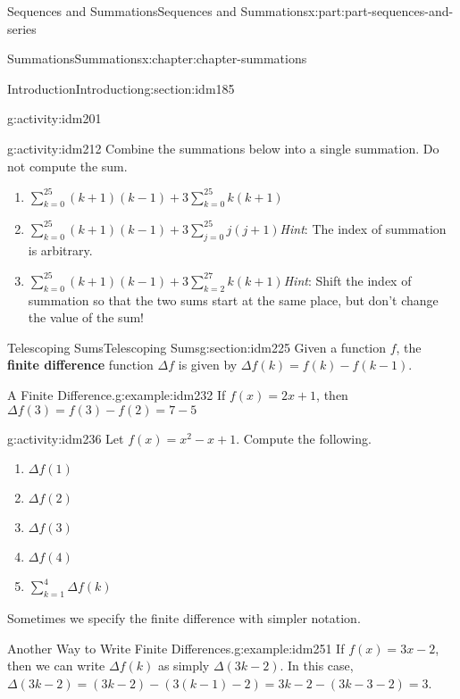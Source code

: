 \documentclass[oneside,10pt,]{book}
\newcommand{\terminology}[1]{\textbf{#1}}
\begin{document}
\begin{partptx}{Sequences and Summations}{}{Sequences and Summations}{}{}{x:part:part-sequences-and-series}
\begin{chapterptx}{Summations}{}{Summations}{}{}{x:chapter:chapter-summations}
\begin{sectionptx}{Introduction}{}{Introduction}{}{}{g:section:idm185}
\begin{activity}{}{g:activity:idm201}
\end{activity}
\begin{activity}{}{g:activity:idm212}%
Combine the summations below into a single summation. Do not compute the sum.%
\begin{enumerate}[font=\bfseries,label=(\alph*),ref=\alph*]
\item{}\(\displaystyle\sum_{k=0}^{25} (k+1)(k-1) + 3\sum_{k=0}^{25} k(k+1)\)\item{}\(\displaystyle\sum_{k=0}^{25} (k+1)(k-1) + 3\sum_{j=0}^{25} j(j+1)\)\emph{Hint}: The index of summation is arbitrary.%
\item{}\(\displaystyle\sum_{k=0}^{25} (k+1)(k-1) + 3\sum_{k=2}^{27} k(k+1)\)\emph{Hint}: Shift the index of summation so that the two sums start at the same place, but don't change the value of the sum!%
\end{enumerate}
\end{activity}
\end{sectionptx}
%
%
\typeout{************************************************}
\typeout{************************************************}
%
\begin{sectionptx}{Telescoping Sums}{}{Telescoping Sums}{}{}{g:section:idm225}
Given a function \(f\), the \terminology{finite difference} function \(\Delta f\) is given by \(\Delta f(k) = f(k) - f(k-1)\).%
\begin{example}{A Finite Difference.}{g:example:idm232}%
 If \(f(x) = 2x+1\), then \(\Delta f(3) = f(3) - f(2) = 7-5\)\end{example}
\begin{activity}{}{g:activity:idm236}%
Let \(f(x) = x^2-x+1\). Compute the following.%
\begin{enumerate}[font=\bfseries,label=(\alph*),ref=\alph*]
\item{}\(\Delta f(1)\)\item{}\(\Delta f(2)\)\item{}\(\Delta f(3)\)\item{}\(\Delta f(4)\)\item{}\(\displaystyle\sum_{k=1}^4\Delta f(k)\)\end{enumerate}
\end{activity}
Sometimes we specify the finite difference with simpler notation.%
\begin{example}{Another Way to Write Finite Differences.}{g:example:idm251}%
If \(f(x) = 3x-2\), then we can write \(\Delta f(k)\) as simply \(\Delta (3k-2)\). In this case, \(\Delta (3k-2) = (3k-2) - (3(k-1)-2) = 3k - 2 - (3k - 3 -2) = 3\).%

\end{example}
\end{sectionptx}
\end{chapterptx}
\end{partptx}
\end{document}
